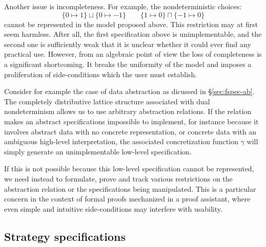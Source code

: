 \documentclass[draft,11pt]{report}
\theoremstyle{definition}
\begin{document}
Another issue is incompleteness.
For example, the nondeterministic choices:
\[
  \{ 0 \mapsto 1 \} \sqcup \{ 0 \mapsto -1 \}
  \qquad
  \{ 1 \mapsto 0 \} \sqcap \{ -1 \mapsto 0 \}
\]
cannot be represented in the model proposed above.
This restriction may at first seem harmless.
After all,
the first specification above is unimplementable,
and the second one is sufficiently weak
that it is unclear whether
it could ever find any practical use.
However,
from an algebraic point of view
the loss of completeness is a significant shortcoming.
It breaks the uniformity of the model
and imposes a proliferation of side-conditions
which the user must establish.

Consider for example
the case of data abstraction as dicussed in \S\ref{sec:fspec-ab}.
The completely distributive lattice structure
associated with dual nondeterminism
allows us to use arbitrary abstraction relations.
If the relation makes an abstract specifications
impossible to implement,
for instance because it involves abstract data
with no concrete representation,
or concrete data with an ambiguous high-level interpretation,
the associated concretization function $\gamma$
will simply generate an unimplementable
low-level specification.

If this is not possible because
this low-level specification cannot be represented,
we need instead to formulate, prove and track various restrictions
on the abstraction relation or the specifications being manipulated.
This is a particular concern in the context of
formal proofs mechanized in a proof assistant,
where even simple and intuitive side-conditions
may interfere with usability.


\subsection{Strategy specifications} %
\end{document}
